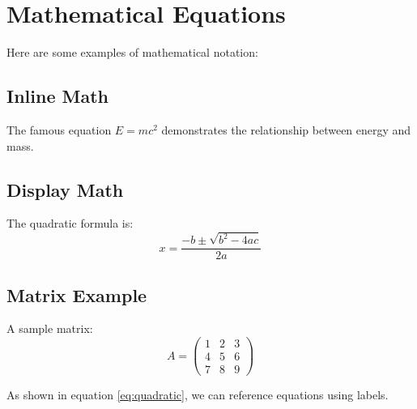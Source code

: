 \section{Mathematical Equations}

Here are some examples of mathematical notation:

\subsection{Inline Math}
The famous equation $E = mc^2$ demonstrates the relationship between energy and mass.

\subsection{Display Math}
The quadratic formula is:
\begin{equation}
x = \frac{-b \pm \sqrt{b^2 - 4ac}}{2a}
\label{eq:quadratic}
\end{equation}

\subsection{Matrix Example}
A sample matrix:
\begin{equation}
A = \begin{pmatrix}
1 & 2 & 3 \\
4 & 5 & 6 \\
7 & 8 & 9
\end{pmatrix}
\label{eq:sample-matrix}
\end{equation}

As shown in equation \ref{eq:quadratic}, we can reference equations using labels.